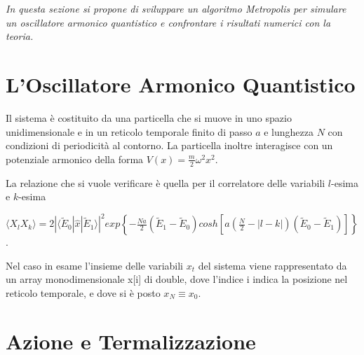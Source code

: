\documentclass[a4paper,11pt]{report}
\begin{document}
\textit{In questa sezione si propone di sviluppare un algoritmo Metropolis per simulare un oscillatore armonico quantistico e confrontare i risultati numerici con la teoria.}

\section{L'Oscillatore Armonico Quantistico}
Il sistema è costituito da una particella che si muove in uno spazio unidimensionale e in un reticolo temporale finito di passo $a$ e lunghezza $N$ con condizioni di periodicità al contorno. La particella inoltre interagisce con un potenziale armonico della forma $V(x) = \frac{m}{2}\omega^2 x^2$.

La relazione che si vuole verificare è quella per il correlatore delle variabili $l$-esima e $k$-esima
\begin{center}
\small
$\langle X_l X_k\rangle = 2|\langle\tilde{E}_0|\hat{x}|\tilde{E}_1\rangle|^2 exp\left\{-\frac{Na}{2}(\tilde{E}_1-\tilde{E}_0)cosh\left[a\left(\frac{N}{2}-|l-k|\right)(\tilde{E}_0-\tilde{E}_1)\right]\right\}$.
\end{center}
Nel caso in esame l'insieme delle variabili $x_t$ del sistema viene rappresentato da un array monodimensionale {\ttfamily x[i]} di {\ttfamily double}, dove l'indice {\ttfamily i} indica la posizione nel reticolo temporale, e dove si è posto $x_N \equiv x_0$.
\section{Azione e Termalizzazione}
\end{document}
